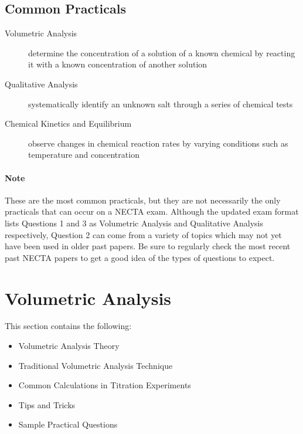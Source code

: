 \subsection{Common Practicals}
\begin{description}
\item[Volumetric Analysis]{determine the concentration of a solution of a known chemical by reacting it with a known concentration of another solution}
\item[Qualitative Analysis]{systematically identify an unknown salt through a series of chemical tests}
\item[Chemical Kinetics and Equilibrium]{observe changes in chemical reaction rates by varying conditions such as temperature and concentration}
\end{description}

\paragraph{Note} These are the most common practicals, but they are not necessarily the only practicals that can occur on a NECTA exam. Although the updated exam format lists Questions 1 and 3 as Volumetric Analysis and Qualitative Analysis respectively, Question 2 can come from a variety of topics which may not yet have been used in older past papers. Be sure to regularly check the most recent past NECTA papers to get a good idea of the types of questions to expect. 


\section{Volumetric Analysis}

This section contains the following: 

\begin{itemize}[topsep=0ex,itemsep=0ex,partopsep=1ex,parsep=1ex]
	\item Volumetric Analysis Theory
	\item Traditional Volumetric Analysis Technique
	\item Common Calculations in Titration Experiments
	\item Tips and Tricks
	\item Sample Practical Questions
\end{itemize}

